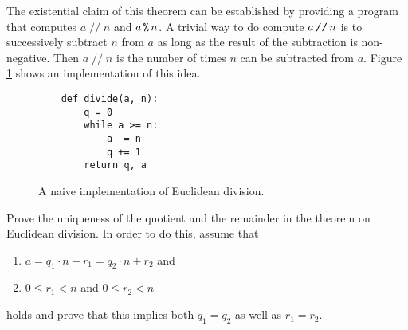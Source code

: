 The existential claim of this theorem can be established by providing a program that computes $a \;\texttt{//}\; n$ and $a \,\texttt{\%}\, n$.  
A trivial way to do compute $a \,\texttt{//}\, n$ is to successively subtract
$n$ from $a$ as long as the result of the subtraction is non-negative.  Then $a \;\texttt{//}\; n$ is the number of times $n$ can be
subtracted from $a$.  Figure \ref{fig:Division-Naive.ipynb} shows an implementation of this idea.

\begin{figure}[!ht]
\centering
\begin{verbatim}
    def divide(a, n):
        q = 0
        while a >= n:
            a -= n
            q += 1
        return q, a
\end{verbatim}
\vspace*{-0.3cm}
\caption{A naive implementation of Euclidean division.}
\label{fig:Division-Naive.ipynb}
\end{figure}
\exercise
Prove the uniqueness of the quotient and the remainder in the theorem on Euclidean division.
In order to do this, assume that
\begin{enumerate}
\item $a = q_1 \cdot n + r_1 = q_2 \cdot n + r_2$ and
\item $0 \leq r_1 < n$ and $0 \leq r_2 < n$
\end{enumerate}
holds and prove that this implies both $q_1 = q_2$ as well as $r_1 = r_2$.  \eox

